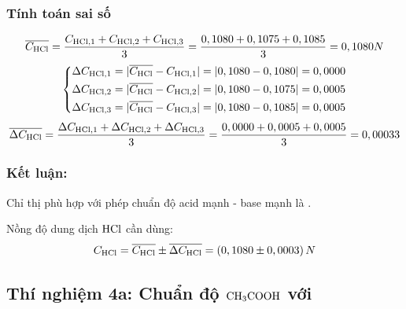     \subsubsection{Tính toán sai số}
        \begin{equation}
            \overline{C_{\ce{HCl}}} = \frac{C_{\ce{HCl}, 1} + C_{\ce{HCl}, 2} + C_{\ce{HCl}, 3}}{3} = \frac{0,1080 + 0,1075 + 0,1085}{3} = 0,1080N
        \end{equation}
        \begin{equation}
            \left\{
            \begin{aligned}
                \Delta C_{\ce{HCl}, 1} = |\overline{C_{\ce{HCl}}} - C_{\ce{HCl}, 1}| = |0,1080 - 0,1080| = 0,0000 \\
                \Delta C_{\ce{HCl}, 2} = |\overline{C_{\ce{HCl}}} - C_{\ce{HCl}, 2}| = |0,1080 - 0,1075| = 0,0005 \\
                \Delta C_{\ce{HCl}, 3} = |\overline{C_{\ce{HCl}}} - C_{\ce{HCl}, 3}| = |0,1080 - 0,1085| = 0,0005
            \end{aligned}
            \right.
        \end{equation}
        \begin{equation}
            \overline{\Delta C_{\ce{HCl}}} = \frac{\Delta C_{\ce{HCl}, 1} + \Delta C_{\ce{HCl}, 2} + \Delta C_{\ce{HCl}, 3}}{3} = \frac{0,0000 + 0,0005 + 0,0005}{3} = 0,00033
        \end{equation}
    \subsubsection{Kết luận:}
    \begin{center}
        Chỉ thị phù hợp với phép chuẩn độ acid mạnh - base mạnh là \textbf{\PhenolphthaleinWord}.
    \end{center}
    Nồng độ dung dịch \(\ce{HCl}\) cần dùng:
    \begin{equation}
        C_{\ce{HCl}} = \overline{C_{\ce{HCl}}} \pm \overline{\Delta C_{\ce{HCl}}} = (0,1080 \pm 0,0003)\,N
    \end{equation}


\subsection{Thí nghiệm 4a: Chuẩn độ \(\ce{CH3COOH}\) với \PhenolphthaleinWord}
